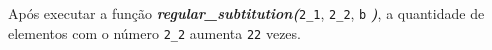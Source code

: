 \documentclass[12pt,varwidth=16cm,border=1pt]{standalone}
\begin{document}
Após executar a função \textbf{\textit{regular\_subtitution(}}\verb+2_1+, \verb+2_2+, \verb+b+ \textbf{\textit{)}}, a quantidade de elementos com o número \verb+2_2+ aumenta \verb+22+ vezes.

\questiomtrue
\end{document}
